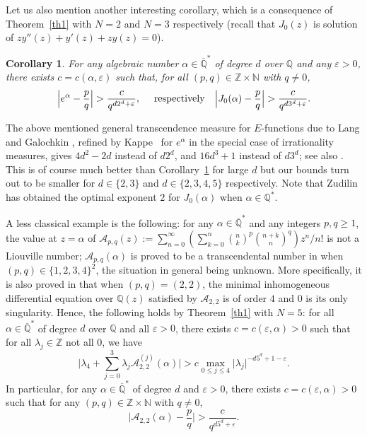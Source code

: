 \documentclass[JEP,XML,SOM,Unicode,published]{cedram}
\newcommand{\Efunctions}{$E$\nobreakdash-func\-tions\xspace}
\newtheorem{coro}{Corollary}
\theoremstyle{definition}
\newcommand{\Z}{\mathbb{Z}}
\newcommand{\Qbar}{\overline{\mathbb Q}}
\let\eps\varepsilon
\begin{document}
Let us also mention another interesting corollary, which is a consequence of Theorem~\ref{th1} with $N=2$ and $N=3$ respectively (recall that $J_0(z)$ is solution of $zy''(z)+y'(z)+zy(z)=0$).
\begin{coro} \label{coro:mesexpj0}
For any algebraic number $\alpha\in \Qbar^*$ of degree $d$ over $\mathbb Q$ and any $\varepsilon>0$, there exists $c=c(\alpha,\varepsilon)$ such that, for all $(p,q)\in \Z\times \mathbb N$ with $q\neq 0$,
\[
\Big \vert e^{\alpha}-\frac pq\Big\vert > \frac{c}{q^{d2^d+\varepsilon}},
\quad \textup{
respectively} \quad
\Big \vert J_0(\alpha)-\frac pq\Big\vert >\frac{c}{q^{d3^d+\varepsilon}}.
\]
\end{coro}
The above mentioned general transcendence measure for \Efunctions due to Lang and Galochkin \cite[p.\,238, Th.\,5.29 \& remarks]{EMS},
refined by Kappe~\cite{kappe} for $e^{\alpha}$ in the special case of irrationality measures, gives $4d^2-2d$ instead of $d2^d$, and $16d^3+1$ instead of $d3^d$; see also \cite[p.\,404]{Shidlovskiilivre}. This is of course much better than Corollary~\ref{coro:mesexpj0} for large $d$ but our bounds turn out to be smaller for $d\in \{2,3\}$ and $d\in \{2,3,4,5\}$ respectively. Note that Zudilin \cite{zudilin} has obtained the optimal exponent $2$ for $J_0(\alpha)$ when $\alpha \in \mathbb{Q}^*$.

A less classical example is the following: for any $\alpha\in \Qbar^*$ and any integers $p,q\ge 1$, the value at $z=\alpha$ of
$\mathcal{A}_{p,q}(z):=\sum_{n=0}^\infty (\sum_{k=0}^n \binom{n}{k}^p\binom{n+k}{n}^q)z^n/n!$ is not a Liouville number; $\mathcal{A}_{p,q}(\alpha)$ is proved to be a transcendental number in \cite[\S 4.6]{BRS2} when $(p,q)\in \{1,2,3,4\}^2$, the situation in general being unknown. More specifically, it is also proved in \cite[\S 4.6, Table\,1]{BRS2} that when $(p,q)=(2,2)$, the minimal inhomogeneous differential equation over $\mathbb Q(z)$ satisfied by $\mathcal{A}_{2,2}$ is of order $4$ and 0 is its only singularity. Hence, the following holds by Theorem~\ref{th1} with $N=5$: for all $\alpha\in \Qbar^*$ of degree $d$ over $\mathbb Q$ and all $\varepsilon>0$, there exists $c=c(\varepsilon, \alpha)>0$ such that for all $\lambda_j\in \mathbb Z$ not all 0, we have
\[
\Big\vert \lambda_4+\sum_{j=0}^3 \lambda_j \mathcal{A}_{2,2}^{(j)}(\alpha) \Big\vert >c
\max_{0\le j\le 4}\vert \lambda_j\vert^{ -d5^d+1-\varepsilon}.
\]
In particular, for any $\alpha\in \Qbar^*$ of degree $d$ and $\eps>0$, there exists $c=c(\varepsilon, \alpha)>0$ such that for any $(p,q)\in\Z\times \mathbb N$ with $q\neq0$,
\begin{equation}\label{eq:A22}
\Big\vert \mathcal{A}_{2,2}(\alpha) -\frac{p}{q}\Big\vert >\frac{c}{q^{
d5^d+\varepsilon}}.
\end{equation}
\end{document}
